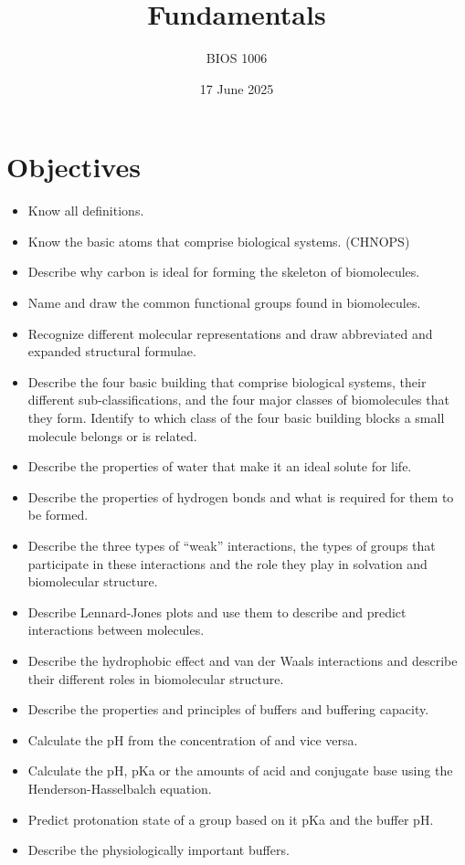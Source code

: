 \documentclass[a4paper, 12pt]{article}
\title{Fundamentals}
\author{BIOS 1006}
\date{17 June 2025}
\begin{document}
\maketitle

\section*{Objectives}

\begin{itemize}
\item Know all definitions.
\item Know the basic atoms that comprise biological systems. (CHNOPS)
\item Describe why carbon is ideal for forming the skeleton of biomolecules.
\item Name and draw the common functional groups found in biomolecules.
\item Recognize different molecular representations and draw abbreviated and expanded structural formulae.
\item Describe the four basic building that comprise biological systems, their different sub-classifications, and the four major classes of biomolecules that they form. Identify to which class of the four basic building blocks a small molecule belongs or is related.
\item Describe the properties of water that make it an ideal solute for life.
\item Describe the properties of hydrogen bonds and what is required for them to be formed.
\item Describe the three types of “weak” interactions, the types of groups that participate in these interactions and the role they play in solvation and biomolecular structure.
\item Describe Lennard-Jones plots and use them to describe and predict interactions between molecules.
\item Describe the hydrophobic effect and van der Waals interactions and describe their different roles in biomolecular structure.
\item Describe the properties and principles of buffers and buffering capacity.
\item Calculate the pH from the concentration of  and vice versa.
\item Calculate the pH, pKa or the amounts of acid and conjugate base using the Henderson-Hasselbalch equation.
\item Predict protonation state of a group based on it pKa and the buffer pH.
\item Describe the physiologically important buffers.
\end{itemize}
\end{document}
